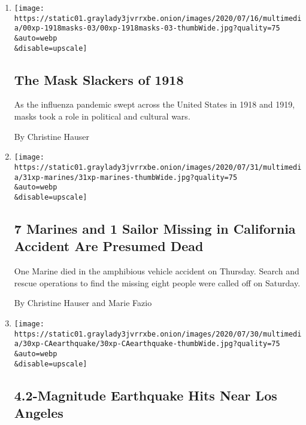 \begin{enumerate}
\def\labelenumi{\arabic{enumi}.}
\item
  \href{/2020/08/03/us/mask-protests-1918.html}{}

  \texttt{[image: https://static01.graylady3jvrrxbe.onion/images/2020/07/16/multimedia/00xp-1918masks-03/00xp-1918masks-03-thumbWide.jpg?quality=75\\\&auto=webp\\\&disable=upscale]}

  \hypertarget{the-mask-slackers-of-1918}{%
  \subsection{The Mask Slackers of
  1918}\label{the-mask-slackers-of-1918}}

  As the influenza pandemic swept across the United States in 1918 and
  1919, masks took a role in political and cultural wars.

  By Christine Hauser
\item
  \href{/2020/07/31/us/marine-accident-california.html}{}

  \texttt{[image: https://static01.graylady3jvrrxbe.onion/images/2020/07/31/multimedia/31xp-marines/31xp-marines-thumbWide.jpg?quality=75\\\&auto=webp\\\&disable=upscale]}

  \hypertarget{7-marines-and-1-sailor-missing-in-california-accident-are-presumed-dead}{%
  \subsection{7 Marines and 1 Sailor Missing in California Accident Are
  Presumed
  Dead}\label{7-marines-and-1-sailor-missing-in-california-accident-are-presumed-dead}}

  One Marine died in the amphibious vehicle accident on Thursday. Search
  and rescue operations to find the missing eight people were called off
  on Saturday.

  By Christine Hauser and Marie Fazio
\item
  \href{/2020/07/30/us/california-earthquake.html}{}

  \texttt{[image: https://static01.graylady3jvrrxbe.onion/images/2020/07/30/multimedia/30xp-CAearthquake/30xp-CAearthquake-thumbWide.jpg?quality=75\\\&auto=webp\\\&disable=upscale]}

  \hypertarget{42-magnitude-earthquake-hits-near-los-angeles}{%
  \subsection{4.2-Magnitude Earthquake Hits Near Los
  Angeles}\label{42-magnitude-earthquake-hits-near-los-angeles}}


\end{enumerate}
